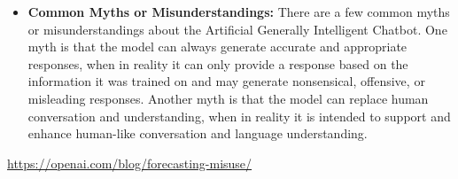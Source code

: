 \begin{itemize}
    \item \textbf{Common Myths or Misunderstandings:} There are a few common myths or misunderstandings about the Artificial Generally Intelligent Chatbot. One myth is that the model can always generate accurate and appropriate responses, when in reality it can only provide a response based on the information it was trained on and may generate nonsensical, offensive, or misleading responses. Another myth is that the model can replace human conversation and understanding, when in reality it is intended to support and enhance human-like conversation and language understanding.
\end{itemize}

\url{https://openai.com/blog/forecasting-misuse/}
